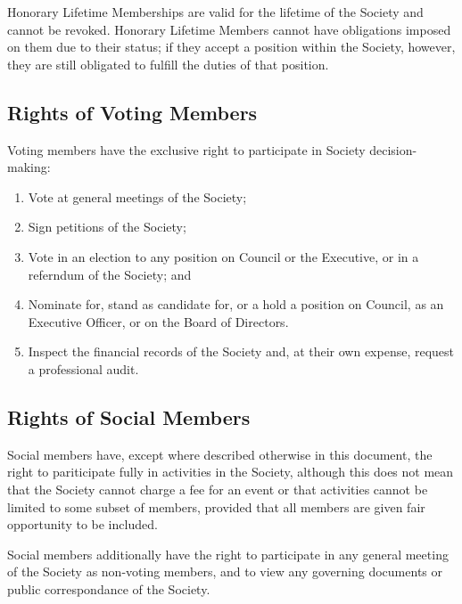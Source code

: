 Honorary Lifetime Memberships are valid for the lifetime of the Society and
cannot be revoked. Honorary Lifetime Members cannot have obligations imposed on
them due to their status; if they accept a position within the Society, however,
they are still obligated to fulfill the duties of that position.

\subsection{Rights of Voting Members}
Voting members have the exclusive right to participate in Society
decision-making:
\begin{enumerate}
  \item Vote at general meetings of the Society;
  \item Sign petitions of the Society;
  \item Vote in an election to any position on Council or the
      Executive, or in a referndum of the Society; and
  \item Nominate for, stand as candidate for, or a hold a position on 
      Council, as an Executive Officer, or on the Board of Directors.
  \item Inspect the financial records of the Society and, at their own expense,
    request a professional audit.
\end{enumerate}

\subsection{Rights of Social Members}
Social members have, except where described otherwise in this document, the
right to pariticipate fully in activities in the Society, although this does not
mean that the Society cannot charge a fee for an event or that activities cannot
be limited to some subset of members, provided that all members are given fair
opportunity to be included.

Social members additionally have the right to participate in any general meeting
of the Society as non-voting members, and to view any governing documents or
public correspondance of the Society.
